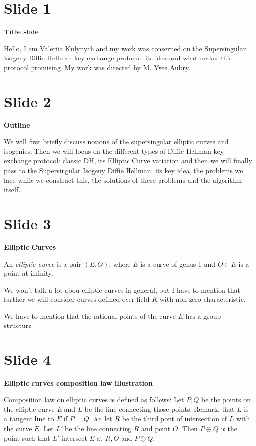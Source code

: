 \documentclass[10 pt]{article}
\title{}
\author{}
\begin{document}
\section{Slide 1} \large{\textbf{Title slide}}

Hello, I am Valeriia Kulynych and my work was conserned on the Supersingular Isogeny Diffie-Hellman key exchange protocol: its idea and what makes this protocol promising. My work was directed by M. Yves Aubry.

\section{Slide 2} \large{\textbf{Outline}}

We will first briefly discuss notions of the supersingular elliptic curves and isogenies. Then we will focus on the different types of Diffie-Hellman key exchange protocol: classic DH, its Elliptic Curve variation and then we will finally pass to the Supersingular Isogeny Diffie Hellman: its key idea, the problems we face while we construct this, the solutions of these problems and the algorithm itself.

\section{Slide 3} \large{\textbf{Elliptic Curves}}

An \emph{elliptic curve} is a pair $(E,O)$, where $E$ is a curve of genus 1 and $O \in E$ is a point at infinity. 

We won't talk a lot abou elliptic curves in general, but I have to mention that further we will consider curves defined over field $K$ with non-zero characteristic.

We have to mention that the rational points of the curve $E$ has a group structure.


\section{Slide 4} \large{\textbf{Elliptic curves composition law illustration}}

Composition law on elliptic curves is defined as follows:
Let $P, Q$ be the points on the elliptic curve $E$ and $L$ be the line connecting those points. Remark, that $L$ is a tangent line to $E$ if $P = Q$. An let $R$ be the third pont of intersection of $L$ with the curve $E$. Let $L'$ be the line connecting $R$ and point $O$. Then $P \oplus Q$ is the point such that $L'$ intersect $E$ at $R, O$ and $P \oplus Q$.
\end{document}
